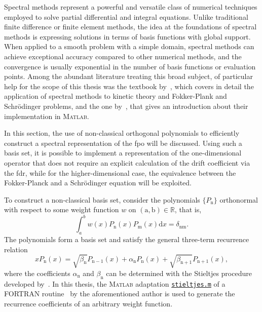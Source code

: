 \documentclass[a4paper,12pt]{book}
\begin{document}
Spectral methods represent a powerful and versatile class of numerical techniques employed to solve partial differential and integral equations. Unlike traditional finite difference or finite element methods, the idea at the foundations of spectral methods is expressing solutions in terms of basis functions with global support. When applied to a smooth problem with a simple domain, spectral methods can achieve exceptional accuracy compared to other numerical methods, and the convergence is usually exponential in the number of basis functions or evaluation points. Among the abundant literature treating this broad subject, of particular help for the scope of this thesis was the textbook by~\textcite{Shizgal2015}, which covers in detail the application of spectral methods to kinetic theory and Fokker-Plank and Schrödinger problems, and the one by~\textcite{trefethen_spectral_2000}, that gives an introduction about their implementation in \textsc{Matlab}.

In this section, the use of non-classical orthogonal polynomials to efficiently construct a spectral representation of the \acrshort{fpo} will be discussed. Using such a basis set, it is possible to implement a representation of the one-dimensional operator that does not require an explicit calculation of the drift coefficient via the \acrshort{fdr}, while for the higher-dimensional case, the equivalence between the Fokker-Planck and a Schrödinger equation will be exploited. 


To construct a non-classical basis set, consider the polynomials $\{P_\text{n}\}$ orthonormal with respect to some weight function $w$ on $(\mathrm{a}, \mathrm{b}) \in \mathbb{R}$, that is,
\begin{equation}
    \label{eq:ort_pol}
    \int_a^b w(x) P_\text{n}(x) P_\text{m}(x) \mathrm{d} x=\delta_{\text{nm}} .
\end{equation}
The polynomials form a basis set and satisfy the general three-term recurrence relation~\parencite{davis2014}
\begin{equation}
    x P_\text{n}(x)=\sqrt{\beta_{\text{n}}} P_{\text{n}-1}(x)+\alpha_{\text{n}} P_\text{n}(x)+\sqrt{\beta_{\text{n}+1}} P_{\text{n}+1}(x),
\end{equation}
where the coefficients $\alpha_{\text{n}}$ and $\beta_{\text{n}}$ can be determined with the Stieltjes procedure developed by~\textcite{GAUTSCHI1985}. In this thesis, the \textsc{Matlab} adaptation \href{https://www.cs.purdue.edu/archives/2002/wxg/codes/OPQ.html}{\texttt{stieltjes.m}} of a \textsc{FORTRAN} routine~\parencite{GAUTSCHI1994} by the aforementioned author is used to generate the recurrence coefficients of an arbitrary weight function. 
\end{document}
